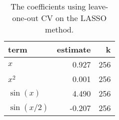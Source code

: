 \begin{table}[t]

\caption{\label{tab:lasso-coefs}The coefficients using leave-one-out \ac{CV} on the \ac{LASSO} method.}
\centering
\begin{tabular}{lrr}
\toprule
term & estimate & k\\
\midrule
\(x\) & 0.927 & 256\\
\(x^2\) & 0.001 & 256\\
\(\sin(x)\) & 4.490 & 256\\
\(\sin(x/2)\) & -0.207 & 256\\
\bottomrule
\end{tabular}
\end{table}